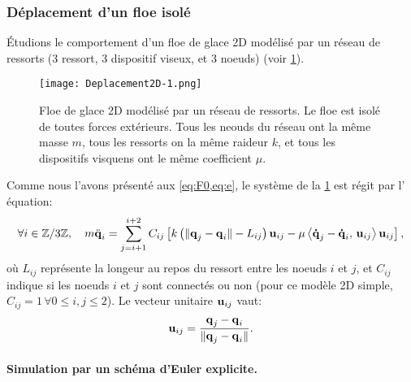 \subsubsection{Déplacement d'un floe isolé}

Étudions le comportement d'un floe de glace 2D modélisé par un réseau de ressorts (3 ressort, 3 dispositif viseux, et 3 noeuds) (voir \cref{fig:deplacement2d}).
\begin{figure}[!h]
    \centering
    \texttt{[image: Deplacement2D-1.png]}
    \caption{Floe de glace 2D modélisé par un réseau de ressorts. Le floe est isolé de toutes forces extérieurs. Tous les neouds du réseau ont la même masse $m$, tous les ressorts on la même raideur $k$, et tous les dispositifs visquens ont le même coefficient $\mu$.}
    \label{fig:deplacement2d}
\end{figure}


\noindent Comme nous l'avons présenté aux \cref{eq:F0,eq:e}, le système de la \cref{fig:deplacement2d} est régit par l' équation:
\begin{align} \label{eq:eprime2}
    \forall i \in \mathbb{Z}/3\mathbb{Z}, \quad m \ddot{\bm{\mathrm{q}}}_i = \sum_{j=i+1}^{i+2}C_{ij} \left[  k \left( \Vert \bm{\mathrm{q}}_j - \bm{\mathrm{q}}_i \Vert - L_{ij} \right) \bm{\mathrm{u}}_{ij} - \mu \left\langle \bm{\mathrm{\dot{q}}}_j - \bm{\mathrm{\dot{q}}}_i, \, \bm{\mathrm{u}}_{ij}  \right\rangle  \bm{\mathrm{u}}_{ij}  \right]  , 
\end{align}
où $L_{ij}$ représente la longeur au repos du ressort entre les noeuds $i$ et $j$, et $C_{ij}$ indique si les noeuds $i$ et $j$ sont connectés ou non (pour ce modèle 2D simple, $C_{ij} = 1 \, \forall 0 \leq i,j \leq 2$). Le vecteur unitaire $\bm{\mathrm{u}}_{ij}$ vaut:
$$
\bm{\mathrm{u}}_{ij} = \frac{\bm{\mathrm{q}}_j - \bm{\mathrm{q}}_i}{\Vert \bm{\mathrm{q}}_j - \bm{\mathrm{q}}_i \Vert}.
$$


\paragraph{Simulation par un schéma d'Euler explicite.}

